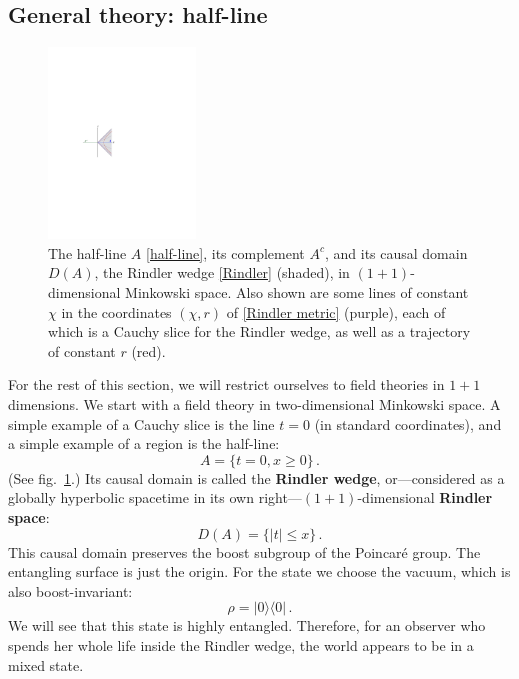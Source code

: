 \documentclass[11pt]{article}
\newcommand{\ket}[1]{|{#1}\rangle}
\newcommand{\bra}[1]{\langle{#1}|}
\begin{document}
\subsection{General theory: half-line}
\label{sec:Rindler}

\begin{figure}[tbp]
\centering
\includegraphics[width=0.35\textwidth]{figs/Rindler.pdf}
\caption{\label{fig:Rindler}
The half-line $A$ \eqref{half-line}, its complement $A^c$, and its causal domain $D(A)$, the Rindler wedge \eqref{Rindler} (shaded), in $(1+1)$-dimensional Minkowski space. Also shown are some lines of constant $\chi$ in the coordinates $(\chi,r)$ of \eqref{Rindler metric} (purple), each of which is a Cauchy slice for the Rindler wedge, as well as a trajectory of constant $r$ (red).
}
\end{figure}

For the rest of this section, we will restrict ourselves to field theories in $1+1$ dimensions. We start with a field theory in two-dimensional Minkowski space. A simple example of a Cauchy slice is the line $t=0$ (in standard coordinates), and a simple example of a region is the half-line:
\begin{equation}\label{half-line}
A = \{t=0,x\ge0\}\,.
\end{equation}
(See fig.\ \ref{fig:Rindler}.) Its causal domain is called the \textbf{Rindler wedge}, or---considered as a globally hyperbolic spacetime in its own right---$(1+1)$-dimensional \textbf{Rindler space}:
\begin{equation}\label{Rindler}
D(A) = \{|t|\le x\}\,.
\end{equation}
This causal domain preserves the boost subgroup of the Poincar\'e group. The entangling surface is just the origin. 
For the state we choose the vacuum, which is also boost-invariant:
\begin{equation}\label{vacuum}
\rho = \ket{0}\bra{0}\,.
\end{equation}
We will see that this state is highly entangled. Therefore, for an observer who spends her whole life inside the Rindler wedge, the world appears to be in a mixed state.
\end{document}
